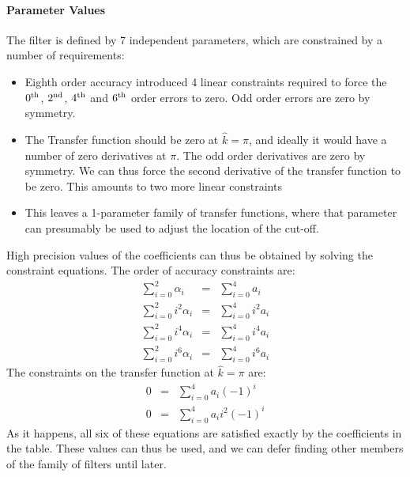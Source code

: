 \documentclass[11pt]{article}%
\begin{document}
\paragraph{Parameter Values} The filter is defined by 7 independent
parameters, which are constrained by a number of requirements:
\begin{itemize}
\item Eighth order accuracy introduced 4 linear constraints required to
      force the $0^{\rm th}$, $2^{\rm nd}$, $4^{\rm th}$ and $6^{\rm
      th}$ 
      order errors to zero. Odd order errors are zero by symmetry.
\item The Transfer function should be zero at $\hat k=\pi$, and ideally
      it would have a number of zero derivatives at $\pi$. The odd order
      derivatives are zero by symmetry. We can thus force the second
      derivative of the transfer function to be zero. This amounts to
      two more linear constraints
\item This leaves a 1-parameter family of transfer functions, where that
      parameter can presumably be used to adjust the location of the
      cut-off.
\end{itemize}
High precision values of the coefficients can thus be obtained by
solving the constraint equations. The order of accuracy constraints are:
\begin{eqnarray}
\sum_{i=0}^2\alpha_i&=&\sum_{i=0}^4a_i\\
\sum_{i=0}^2i^2\alpha_i&=&\sum_{i=0}^4i^2a_i\\
\sum_{i=0}^2i^4\alpha_i&=&\sum_{i=0}^4i^4a_i\\
\sum_{i=0}^2i^6\alpha_i&=&\sum_{i=0}^4i^6a_i
\end{eqnarray}
The constraints on the transfer function at $\hat k=\pi$ are:
\begin{eqnarray}
0&=&\sum_{i=0}^4a_i(-1)^i\\
0&=&\sum_{i=0}^4a_i i^2 (-1)^i
\end{eqnarray}
As it happens, all six of these equations are satisfied exactly by the
coefficients in the table. These values can thus be used, and we can defer finding other
members of the family of filters until later.
\end{document}
